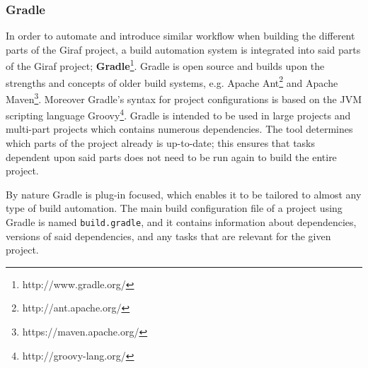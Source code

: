 \subsubsection*{Gradle}
In order to automate and introduce similar workflow when building the different parts of the Giraf project, a build automation system is integrated into said parts of the Giraf project; \textbf{Gradle}\footnote{http://www.gradle.org/}.
Gradle is open source and builds upon the strengths and concepts of older build systems, e.g. Apache Ant\footnote{http://ant.apache.org/} and Apache Maven\footnote{https://maven.apache.org/}.
Moreover Gradle's syntax for project configurations is based on the JVM scripting language Groovy\footnote{http://groovy-lang.org/}.
Gradle is intended to be used in large projects and multi-part projects which contains numerous dependencies.
The tool determines which parts of the project already is up-to-date; this ensures that tasks dependent upon said parts does not need to be run again to build the entire project. 

By nature Gradle is plug-in focused, which enables it to be tailored to almost any type of build automation.
The main build configuration file of a project using Gradle is named \texttt{build.gradle}, and it contains information about dependencies, versions of said dependencies, and any tasks that are relevant for the given project.